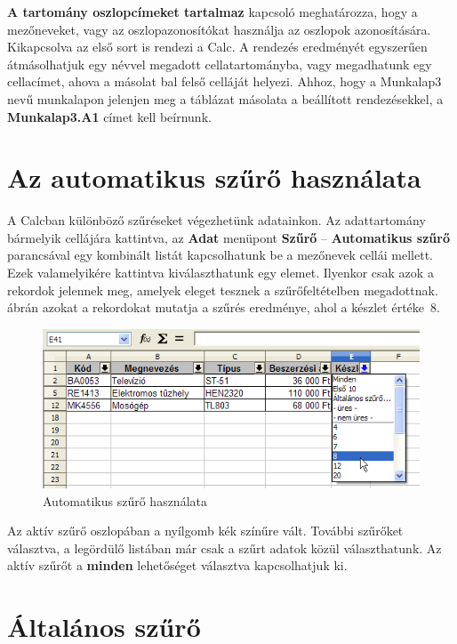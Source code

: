 \textbf{A tartomány oszlopcímeket tartalmaz} kapcsoló
meghatározza, hogy a mezőneveket, vagy az oszlopazonosítókat
használja az oszlopok azonosítására. Kikapcsolva az első
sort is rendezi a Calc. A rendezés eredményét egyszerűen
átmásolhatjuk egy névvel megadott cellatartományba, vagy
megadhatunk egy cellacímet, ahova a másolat bal felső
celláját helyezi. Ahhoz, hogy a Munkalap3 nevű munkalapon
jelenjen meg a táblázat másolata a beállított
rendezésekkel, a \textbf{Munkalap3.A1} címet kell beírnunk.


\section{Az automatikus szűrő használata}

A Calcban különböző szűréseket végezhetünk
adatainkon. Az adattartomány bármelyik cellájára kattintva, az
\textbf{Adat} menüpont \textbf{Szűrő} -- \textbf{Automatikus
szűrő} parancsával egy kombinált listát kapcsolhatunk be
a mezőnevek cellái mellett. Ezek valamelyikére kattintva
kiválaszthatunk egy elemet. Ilyenkor csak azok a rekordok jelennek
meg, amelyek eleget tesznek a szűrőfeltételben megadottnak.
 ábrán azokat a rekordokat mutatja
a szűrés eredménye, ahol a készlet értéke~8.

\begin{figure}[!h]
\begin{center}
\includegraphics[width=13.524cm]{oocalcv2-img114.png}
\caption{Automatikus szűrő használata}\label{AutomatikusSzűrő}
\end{center}
\end{figure}

Az aktív szűrő oszlopában a nyílgomb kék színűre
vált. További szűrőket választva, a legördülő
listában már csak a szűrt adatok közül választhatunk. Az
aktív szűrőt a \textbf{minden} lehetőséget
választva kapcsolhatjuk ki.


\section{Általános szűrő}


